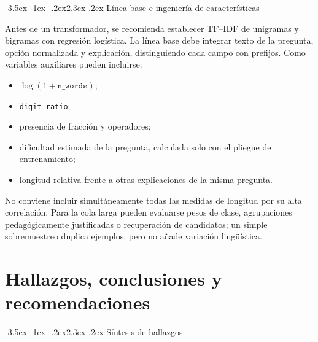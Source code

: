 \documentclass[11pt,oneside,openany]{book}
\makeatletter
\renewcommand\section{\@startsection{section}{1}{\z@}%
  {-3.5ex \@plus -1ex \@minus -.2ex}{2.3ex \@plus .2ex}%
  {\normalfont\Large\sffamily\bfseries\color{AzulMedio}}}
\newcommand{\codigo}[1]{\texttt{#1}}
\makeatother
\begin{document}
\section{Línea base e ingeniería de características}

Antes de un transformador, se recomienda establecer TF--IDF de unigramas y
bigramas con regresión logística. La línea base debe integrar texto de la
pregunta, opción normalizada y explicación, distinguiendo cada campo con
prefijos. Como variables auxiliares pueden incluirse:

\begin{itemize}
  \item \(\log(1+\codigo{n\_words})\);
  \item \codigo{digit\_ratio};
  \item presencia de fracción y operadores;
  \item dificultad estimada de la pregunta, calculada solo con el pliegue de
        entrenamiento;
  \item longitud relativa frente a otras explicaciones de la misma pregunta.
\end{itemize}

No conviene incluir simultáneamente todas las medidas de longitud por su alta
correlación. Para la cola larga pueden evaluarse pesos de clase, agrupaciones
pedagógicamente justificadas o recuperación de candidatos; un simple
sobremuestreo duplica ejemplos, pero no añade variación lingüística.

\chapter{Hallazgos, conclusiones y recomendaciones}

\section{Síntesis de hallazgos}
\end{document}
